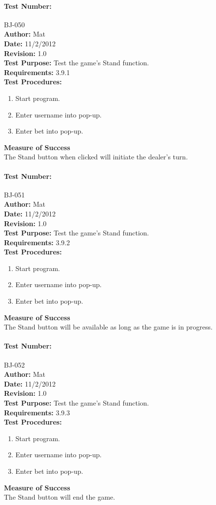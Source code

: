 \documentclass{article}
\begin{document}
\paragraph{Test Number:} BJ-050\\
\textbf{Author:} Mat\\
\textbf{Date:} 11/2/2012\\
\textbf{Revision:} 1.0\\
\textbf{Test Purpose:} Test the game's Stand function.\\
\textbf{Requirements:} 3.9.1 \\
\textbf{Test Procedures:} 
\begin{enumerate}
\item Start program.
\item Enter username into pop-up.
\item Enter bet into pop-up.
\end{enumerate}
\textbf{Measure of Success}\\The Stand button when clicked will initiate the dealer's turn.
\paragraph{Test Number:} BJ-051\\
\textbf{Author:} Mat\\
\textbf{Date:} 11/2/2012\\
\textbf{Revision:} 1.0\\
\textbf{Test Purpose:} Test the game's Stand function.\\
\textbf{Requirements:} 3.9.2 \\
\textbf{Test Procedures:} 
\begin{enumerate}
\item Start program.
\item Enter username into pop-up.
\item Enter bet into pop-up.
\end{enumerate}
\textbf{Measure of Success}\\The Stand button will be available as long as the game is in progress.
\paragraph{Test Number:} BJ-052\\
\textbf{Author:} Mat\\
\textbf{Date:} 11/2/2012\\
\textbf{Revision:} 1.0\\
\textbf{Test Purpose:} Test the game's Stand function.\\
\textbf{Requirements:} 3.9.3 \\
\textbf{Test Procedures:} 
\begin{enumerate}
\item Start program.
\item Enter username into pop-up.
\item Enter bet into pop-up.
\end{enumerate}
\textbf{Measure of Success}\\The Stand button will end the game.
\end{document}

